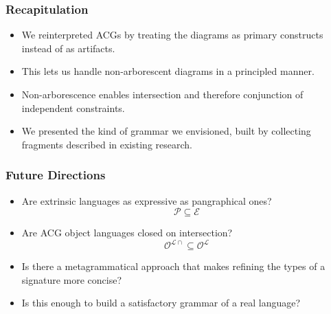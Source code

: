 \documentclass{beamer}
\begin{document}
\begin{frame}
  \frametitle{Recapitulation}

  \begin{itemize}
  \item We reinterpreted ACGs by treating the diagrams as primary constructs
    instead of as artifacts.
  \vfill
  \pause
  \item This lets us handle non-arborescent diagrams in a principled manner.
  \vfill
  \pause
  \item Non-arborescence enables intersection and therefore conjunction of
    independent constraints.
  \vfill
  \pause
  \item We presented the kind of grammar we envisioned, built by collecting
    fragments described in existing research.
  \end{itemize}
\end{frame}


\begin{frame}
  \frametitle{Future Directions}

  \begin{itemize}
  \item Are extrinsic languages as expressive as pangraphical
    ones? $$\mathcal{P} \subseteq \mathcal{E}$$
  \item Are ACG object languages closed on
    intersection? $$\mathcal{O}^{\mathcal{L}{\cap}} \subseteq \mathcal{O}^{\mathcal{L}}$$
  \item Is there a metagrammatical approach that makes refining the types of a
    signature more concise?
  \vfill
  \item Is this enough to build a satisfactory grammar of a real language?
  \end{itemize}
\end{frame}
\end{document}
